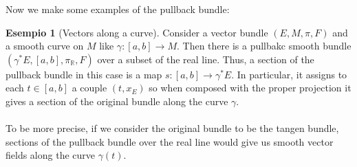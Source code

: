 \documentclass[12pt,a4paper]{report}
\theoremstyle{definition}
\theoremstyle{Theorem}
\theoremstyle{definition}
\newtheorem{Ex}[Def]{Esempio}
\theoremstyle{definition}
\theoremstyle{definition}
\begin{document}
			Now we make some examples of the pullback bundle:
			\begin{Ex} [Vectors along a curve]
				Consider a vector bundle $(E,M,\pi,F)$ and a smooth curve on $M$ like $\gamma:[a,b]\rightarrow M$. Then there is a pullbakc smooth bundle $(\gamma^*E,[a,b],\pi_\mathbb{R},F)$ over a subset of the real line. Thus, a section of the pullback bundle in this case is a map $s:[a,b]\rightarrow \gamma^*E$. In particular, it assigns to each $t\in[a,b]$ a couple $(t,x_E)$ so when composed with the proper projection it gives a section of the original bundle along the curve $\gamma$.\\
				\\
				To be more precise, if we consider the original bundle to be the tangen bundle, sections of the pullback bundle over the real line would give us smooth vector fields along the curve $\gamma(t)$.
			\end{Ex}
\end{document}
